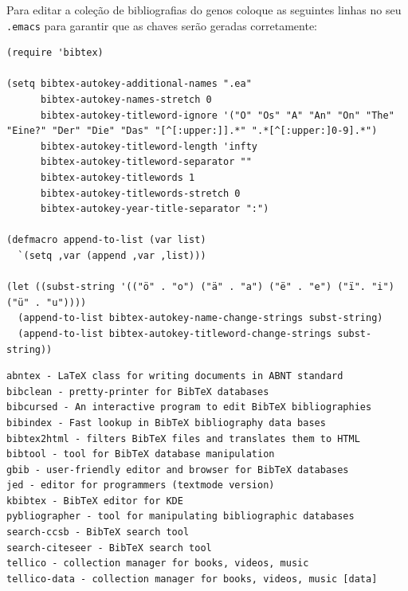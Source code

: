 \documentclass[12pt,brazil]{book}
\begin{document}
Para editar a coleção de bibliografias do genos coloque as seguintes
linhas no seu \texttt{.emacs} para garantir que as chaves serão
geradas corretamente:

\begin{verbatim}
(require 'bibtex)

(setq bibtex-autokey-additional-names ".ea"
      bibtex-autokey-names-stretch 0
      bibtex-autokey-titleword-ignore '("O" "Os" "A" "An" "On" "The" "Eine?" "Der" "Die" "Das" "[^[:upper:]].*" ".*[^[:upper:]0-9].*")
      bibtex-autokey-titleword-length 'infty
      bibtex-autokey-titleword-separator ""
      bibtex-autokey-titlewords 1
      bibtex-autokey-titlewords-stretch 0
      bibtex-autokey-year-title-separator ":")

(defmacro append-to-list (var list)
  `(setq ,var (append ,var ,list)))

(let ((subst-string '(("ö" . "o") ("ä" . "a") ("ë" . "e") ("ï". "i") ("ü" . "u"))))
  (append-to-list bibtex-autokey-name-change-strings subst-string)
  (append-to-list bibtex-autokey-titleword-change-strings subst-string))
\end{verbatim}

\begin{verbatim}
abntex - LaTeX class for writing documents in ABNT standard
bibclean - pretty-printer for BibTeX databases
bibcursed - An interactive program to edit BibTeX bibliographies
bibindex - Fast lookup in BibTeX bibliography data bases
bibtex2html - filters BibTeX files and translates them to HTML
bibtool - tool for BibTeX database manipulation
gbib - user-friendly editor and browser for BibTeX databases
jed - editor for programmers (textmode version)
kbibtex - BibTeX editor for KDE
pybliographer - tool for manipulating bibliographic databases
search-ccsb - BibTeX search tool
search-citeseer - BibTeX search tool
tellico - collection manager for books, videos, music
tellico-data - collection manager for books, videos, music [data]
\end{verbatim}




\end{document}
